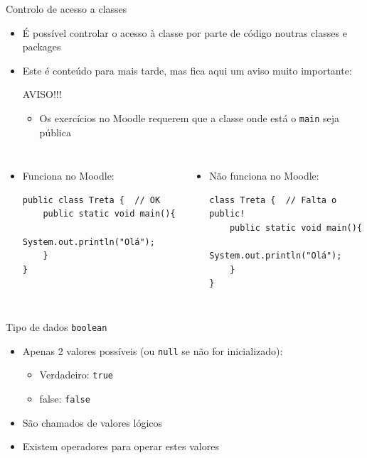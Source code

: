 \documentclass[portuguese, aspectratio=169, xcolor=table]{beamer}
\begin{document}
\begin{frame}[fragile]{Controlo de acesso a classes}
\begin{itemize}
    \item É possível controlar o acesso à classe por parte de código noutras classes e packages
    \item Este é conteúdo para mais tarde, mas fica aqui um aviso muito importante:
    \begin{alertblock}{AVISO!!!}
        \begin{itemize}
            \item Os exercícios no Moodle requerem que a classe onde está o \texttt{main} seja pública
        \end{itemize}
    \end{alertblock}
\end{itemize}
\begin{columns}
\begin{itemize}
    \item Funciona no Moodle:
\begin{verbatim}
public class Treta {  // OK
    public static void main(){
        System.out.println("Olá");
    }
}
\end{verbatim}
\end{itemize}
\begin{itemize}
\item Não funciona no Moodle:
\begin{verbatim}
class Treta {  // Falta o public!
    public static void main(){
        System.out.println("Olá");
    }
}
\end{verbatim}
\end{itemize}
\end{columns}
\end{frame}


\begin{frame}{Tipo de dados \texttt{boolean}}
\begin{itemize}
    \item Apenas 2 valores possíveis (ou \texttt{null} se não for inicializado):
    \begin{itemize}
        \item Verdadeiro: \texttt{true}
        \item false: \texttt{false} 
    \end{itemize}
\item São chamados de valores lógicos
\item Existem operadores para operar estes valores
\end{itemize}
\end{frame}
\end{document}
